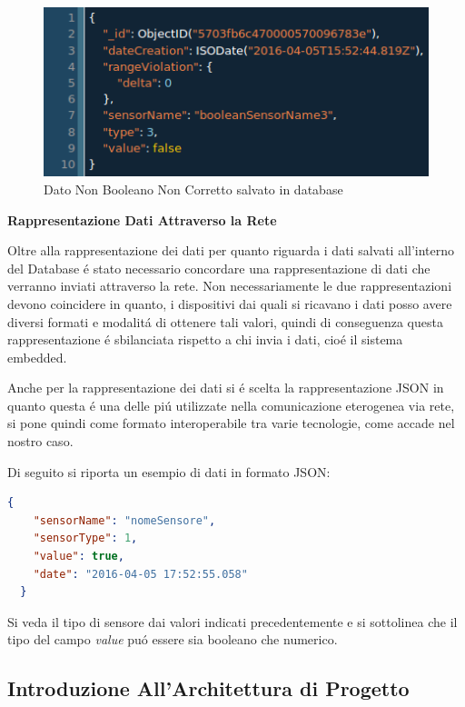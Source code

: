 \begin{figure}[ht]
\centering
\includegraphics[scale=0.5,natwidth=610,natheight=642]{Figures/DataStructures/BooleanDataViolation.png}
\caption{Dato Non Booleano Non Corretto salvato in database}
\end{figure}

\afterpage{\clearpage}

\newpage

\begin{center}
  \textbf{Rappresentazione Dati Attraverso la Rete}
\end{center}

Oltre alla rappresentazione dei dati per quanto riguarda i dati salvati all'interno del Database \'e stato necessario concordare una rappresentazione di dati che verranno inviati attraverso la rete. Non necessariamente le due rappresentazioni devono coincidere in quanto, i dispositivi dai quali si ricavano i dati posso avere diversi formati e modalit\'a di ottenere tali valori, quindi di conseguenza questa rappresentazione \'e sbilanciata rispetto a chi invia i dati, cio\'e il sistema embedded.

Anche per la rappresentazione dei dati si \'e scelta la rappresentazione JSON in quanto questa \'e una delle pi\'u utilizzate nella comunicazione eterogenea via rete, si pone quindi come formato interoperabile tra varie tecnologie, come accade nel nostro caso.

Di seguito si riporta un esempio di dati in formato JSON:

\begin{lstlisting}[language=json]
  {
    "sensorName": "nomeSensore",
    "sensorType": 1,
    "value": true,
    "date": "2016-04-05 17:52:55.058"
  }
\end{lstlisting}

Si veda il tipo di sensore dai valori indicati precedentemente e si sottolinea che il tipo del campo \textit{value} pu\'o essere sia booleano che numerico.

\subsection{Introduzione All'Architettura di Progetto}

